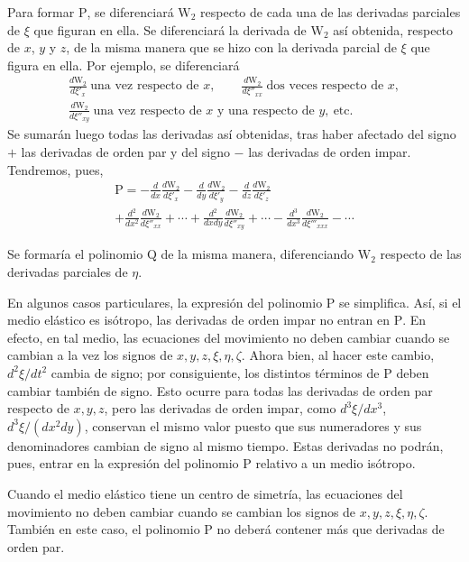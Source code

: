 Para formar $\mathrm P$, se diferenciará $\mathrm{W}_2$ respecto de cada una de las
derivadas parciales de $\xi$ que figuran en ella. Se diferenciará la
derivada de $\mathrm{W}_2$ así obtenida, respecto de $x$, $y$ y $z$, de la misma
manera que se hizo con la derivada parcial de $\xi$ que figura en ella. Por
ejemplo, se diferenciará
\begin{gather*}
\frac{d\mathrm{W}_2}{d\xi'_x}\ \text{una vez respecto de }x,\qquad
\frac{d\mathrm{W}_2}{d\xi''_{xx}}\ \text{dos veces respecto de }x,\\
\frac{d\mathrm{W}_2}{d\xi''_{xy}}\ \text{una vez respecto de }x\text{ y una respecto de }y,\ \text{etc.}
\end{gather*}
Se sumarán luego todas las derivadas así obtenidas, tras haber afectado del
signo $+$ las derivadas de orden par y del signo $-$ las derivadas de orden
impar. Tendremos, pues,
\begin{multline*}
\mathrm P = -\frac{d}{dx}\frac{d\mathrm{W}_2}{d\xi'_x}-\frac{d}{dy}\frac{d\mathrm{W}_2}{d\xi'_y}
-\frac{d}{dz}\frac{d\mathrm{W}_2}{d\xi'_z}\\
+\frac{d^2}{dx^2}\frac{d\mathrm{W}_2}{d\xi''_{xx}}+\cdots
+\frac{d^2}{dxdy}\frac{d\mathrm{W}_2}{d\xi''_{xy}}+\cdots
-\frac{d^3}{dx^3}\frac{d\mathrm{W}_2}{d\xi'''_{xxx}}-\cdots
\end{multline*}

Se formaría el polinomio $\mathrm Q$ de la misma manera, diferenciando
$\mathrm{W}_2$ respecto de las derivadas parciales de $\eta$.

En algunos casos particulares, la expresión del polinomio $\mathrm P$ se
simplifica. Así, si el medio elástico es isótropo, las derivadas de orden
impar no entran en $\mathrm P$. En efecto, en tal medio, las ecuaciones del
movimiento no deben cambiar cuando se cambian a la vez los signos de
$x,y,z,\xi,\eta,\zeta$. Ahora bien, al hacer este cambio, $d^2\xi/dt^2$
cambia de signo; por consiguiente, los distintos términos de $\mathrm P$
deben cambiar también de signo. Esto ocurre para todas las derivadas de
orden par respecto de $x,y,z$, pero las derivadas de orden impar, como
$d^3\xi/dx^3$, $d^3\xi/(dx^2dy)$, conservan el mismo valor puesto que sus
numeradores y sus denominadores cambian de signo al mismo tiempo. Estas
derivadas no podrán, pues, entrar en la expresión del polinomio $\mathrm P$
relativo a un medio isótropo.

Cuando el medio elástico tiene un centro de simetría, las ecuaciones del
movimiento no deben cambiar cuando se cambian los signos de
$x,y,z,\xi,\eta,\zeta$. También en este caso, el polinomio $\mathrm P$ no
deberá contener más que derivadas de orden par.

